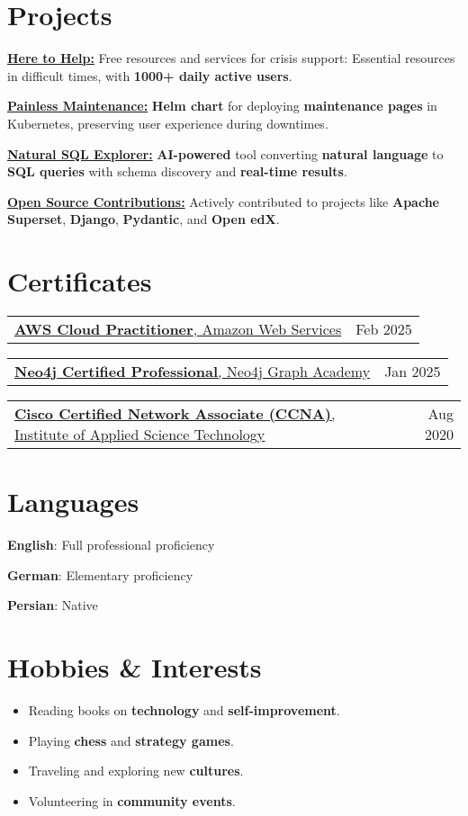 \documentclass[letterpaper,11pt]{article}
\makeatletter
\newcommand{\resumeItemSimple}[1]{
  \item\small{
    {#1}
  }
}
\newcommand{\resumeItemListStart}{\begin{itemize}[leftmargin=0.5cm, itemsep=1pt, parsep=0pt]} %
\newcommand{\resumeItemListEnd}{\end{itemize}}
\newcommand{\titleWithDescription}[2]{\textbf{#1}{: #2}}
\newcommand{\languageItem}[2]{
    \titleWithDescription{#1}{#2}
}
\newcommand{\certificateItem}[4]{
  \begin{tabular*}{1\textwidth}{l@{\extracolsep{\fill}}r}
    \href{#3}{\textbf{#1}{, #2}} & \small #4 \\
  \end{tabular*}\vspace{-10px}
}
\newcommand{\projectItem}[3]{
  \href{#3}{\textbf{#1:}} #2 \\ {\vspace{3px}}
}
\makeatother
\begin{document}
\section{Projects}
  \projectItem{Here to Help}{Free resources and services for crisis support: Essential resources in difficult times, with \textbf{1000+ daily active users}.}{https://github.com/iranian-github/here-to-help}
  \projectItem{Painless Maintenance}{\textbf{Helm chart} for deploying \textbf{maintenance pages} in Kubernetes, preserving user experience during downtimes.}{https://github.com/CodeWithEmad/helm-charts/tree/master/charts/maintenance}
  \projectItem{Natural SQL Explorer}{\textbf{AI-powered} tool converting \textbf{natural language} to \textbf{SQL queries} with schema discovery and \textbf{real-time results}.}{https://github.com/CodeWithEmad/natural-sql-explorer}
  \projectItem{Open Source Contributions}{Actively contributed to projects like \textbf{Apache Superset}, \textbf{Django}, \textbf{Pydantic}, and \textbf{Open edX}.}{https://github.com/codewithemad}

\section{Certificates}
  \certificateItem
    {AWS Cloud Practitioner}
    {Amazon Web Services}
    {https://www.credly.com/badges/ed1e4a0f-daa1-448d-a060-acb8de1d2ee6}
    {Feb 2025}

    \certificateItem
    {Neo4j Certified Professional}
    {Neo4j Graph Academy}
    {https://graphacademy.neo4j.com/c/d8f0842b-9363-4d27-a25c-68b9cde0aa64/}
    {Jan 2025}

    \certificateItem
    {Cisco Certified Network Associate (CCNA)}
    {Institute of Applied Science Technology}
    {}
    {Aug 2020}


\section{Languages}
  \languageItem
    {English}
    {Full professional proficiency}
  \hfill
  \languageItem
    {German}
    {Elementary proficiency}
  \hfill
  \languageItem
    {Persian}
    {Native}
  {\vspace{3px}}

\section{Hobbies \& Interests}
  \resumeItemListStart
    \resumeItemSimple{Reading books on \textbf{technology} and \textbf{self-improvement}.}
    \resumeItemSimple{Playing \textbf{chess} and \textbf{strategy games}.}
    \resumeItemSimple{Traveling and exploring new \textbf{cultures}.}
    \resumeItemSimple{Volunteering in \textbf{community events}.}
  \resumeItemListEnd
\end{document}
